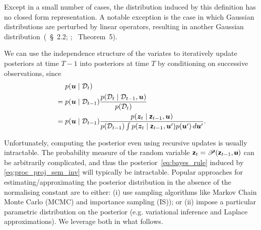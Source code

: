 

Except in a small number of cases, the distribution induced by this definition has no closed form representation. 
A notable exception is the case in which Gaussian distributions are perturbed by linear operators, resulting in another Gaussian distribution~(\citealp{RasmussenGaussian2006}~\S~2.2; \citealp{solak2002derivative}; \citealp{ghosal2006posterior}~Theorem~5).

We can use the independence structure of the variates to iteratively update posteriors at time $T-1$ into posteriors at time $T$ by conditioning on successive observations, since
\begin{align*}
    &\phantom{{}={}} p(\forcingst \gvn \mathcal{D}_{t}) \\
    &= p(\forcingst \gvn \mathcal{D}_{t-1} ) \frac{ p(\mathcal{D}_t \gvn \mathcal{D}_{t-1}, \forcingst)}{p(\mathcal{D}_t)} \\
    &= p(\forcingst \gvn \mathcal{D}_{t-1} ) \frac{ p(\statest_t \gvn \state_{t-1}, \forcingst)}{p(\mathcal{D}_{t-1})\int p(\statest_t \gvn \state_{t-1}, \forcingst') p(\forcingst') \, d\forcingst'}.
\end{align*}

Unfortunately, computing the posterior even using recursive updates is usually intractable.
The %
probability measure of the random variable $\boldsymbol{\mathsf{z}}_t = \mathscr{P}(\boldsymbol{\mathsf{z}}_{t-1}, \boldsymbol{\mathsf{u}})$  can be arbitrarily complicated, and thus the posterior~\eqref{eq:bayes_rule} induced by \eqref{eq:proc_proj_sem_inv} will typically be intractable.
Popular approaches for estimating/approximating the posterior distribution in the absence of the normalising constant are to either: (i) use sampling algorithms like Markov Chain Monte Carlo (MCMC) and importance sampling (IS)); or (ii) impose a particular parametric distribution on the posterior (e.g. variational inference and Laplace approximations).
We leverage both in what follows.

